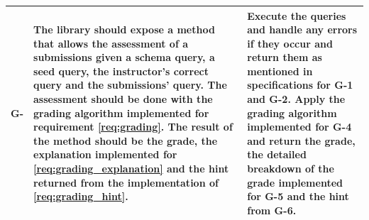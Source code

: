 \begin{tabularx}{\textwidth}{|c|Y|Y|}
G- & The library should expose a method that allows the assessment of a submissions given a schema query, a seed query, the instructor's correct query and the submissions' query.  The assessment should be done with the grading algorithm implemented for requirement \ref{req:grading}. The result of the method should be the grade, the explanation implemented for \ref{req:grading_explanation} and the hint returned from the implementation of \ref{req:grading_hint}. & Execute the queries and handle any errors if they occur and return them as mentioned in specifications for G-1 and G-2. Apply the grading algorithm implemented for G-4 and return the grade, the detailed breakdown of the grade implemented for G-5 and the hint from G-6. \\\hline
\end{tabularx}
